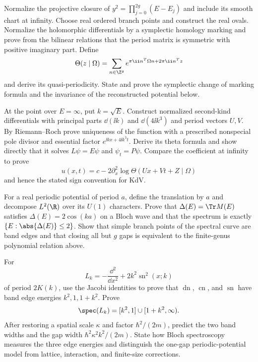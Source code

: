 \begin{exercise}
Normalize the projective closure of
$y^2=\prod_{j=0}^{2g}(E-E_j)$ and include its smooth chart at infinity.
Choose real ordered branch points and construct the real ovals.  Normalize
the holomorphic differentials by a symplectic homology marking and prove from
the bilinear relations that the period matrix is symmetric with positive
imaginary part.  Define
\[
 \Theta(z\mid\Omega)=\sum_{n\in\Z^g}
 e^{\pi\ii n^T\Omega n+2\pi\ii n^Tz}
\]
and derive its quasi-periodicity.  State and prove the symplectic change of
marking formula and the invariance of the reconstructed potential below.
\end{exercise}

\begin{exercise}
At the point over $E=\infty$, put $k=\sqrt E$.  Construct normalized
second-kind differentials with principal parts $\dd(\ii k)$ and
$\dd(4\ii k^3)$ and period vectors $U,V$.  By Riemann--Roch prove uniqueness
of the function with a prescribed nonspecial pole divisor and essential
factor $e^{\ii kx+4\ii k^3t}$.  Derive its theta formula and show directly
that it solves $L\psi=E\psi$ and $\psi_t=P\psi$.  Compare the coefficient at
infinity to prove
\[
 u(x,t)=c-2\partial_x^2\log\Theta(Ux+Vt+Z\mid\Omega)
\]
and hence the stated sign convention for KdV.
\end{exercise}

\begin{exercise}
For a real periodic potential of period $a$, define the translation by $a$
and decompose $L^2(\R)$ over its $U(1)$ characters.  Prove that
$\Delta(E)=\Tr M(E)$ satisfies
$\Delta(E)=2\cos(ka)$ on a Bloch wave and that the spectrum is exactly
$\{E:\abs{\Delta(E)}\le2\}$.  Show that simple branch points of the spectral
curve are band edges and that closing all but $g$ gaps is equivalent to the
finite-genus polynomial relation above.
\end{exercise}

\begin{exercise}
For
\[
 L_k=-\frac{\dd^2}{\dd x^2}+2k^2\operatorname{sn}^2(x;k)
\]
of period $2K(k)$, use the Jacobi identities to prove that
$\operatorname{dn}$, $\operatorname{cn}$, and $\operatorname{sn}$ have band
edge energies $k^2,1,1+k^2$.  Prove
\[
 \spec(L_k)=[k^2,1]\cup[1+k^2,\infty).
\]
After restoring a spatial scale $\kappa$ and factor $\hbar^2/(2m)$, predict
the two band widths and the gap width
$\hbar^2\kappa^2k^2/(2m)$.  State how Bloch spectroscopy measures the three
edge energies and distinguish the one-gap periodic-potential model from
lattice, interaction, and finite-size corrections.
\end{exercise}

